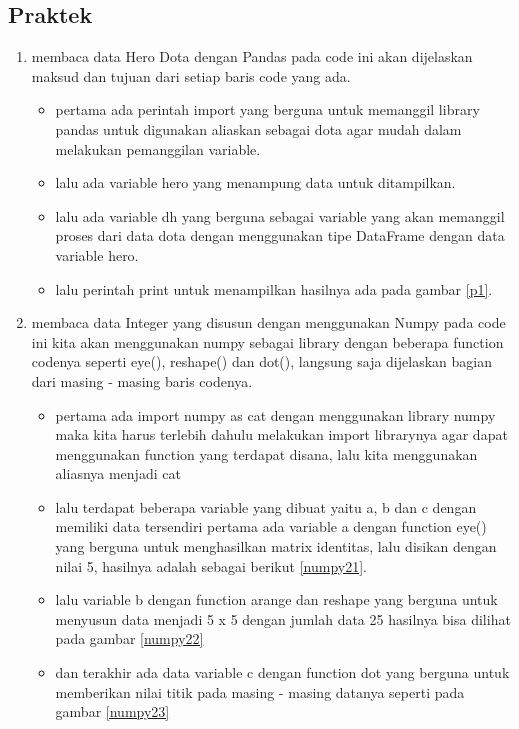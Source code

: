 \subsection{Praktek}
\begin{enumerate}
\item membaca data Hero Dota dengan Pandas
\subitem
pada code ini akan dijelaskan maksud dan tujuan dari setiap baris code yang ada.
\begin{itemize}
\item pertama ada perintah import yang berguna untuk memanggil library pandas untuk digunakan aliaskan sebagai dota agar mudah dalam melakukan pemanggilan variable.
\item lalu ada variable hero yang menampung data untuk ditampilkan.
\item lalu ada variable dh yang berguna sebagai variable yang akan memanggil proses dari data dota dengan menggunakan tipe DataFrame dengan data variable hero.
\item lalu perintah print untuk menampilkan hasilnya ada pada gambar \ref{p1}.
\end{itemize}

\item membaca data Integer yang disusun dengan menggunakan Numpy
\subitem 
pada code ini kita akan menggunakan numpy sebagai library dengan beberapa function codenya seperti eye(), reshape() dan dot(), langsung saja dijelaskan bagian dari masing - masing baris codenya.
\begin{itemize}
\item pertama ada import numpy as cat dengan menggunakan library numpy maka kita harus terlebih dahulu melakukan import librarynya agar dapat menggunakan function yang terdapat disana, lalu kita menggunakan aliasnya menjadi cat
\item lalu terdapat beberapa variable yang dibuat yaitu a, b dan c dengan memiliki data tersendiri pertama ada variable a dengan function eye() yang berguna untuk menghasilkan matrix identitas, lalu disikan dengan nilai 5, hasilnya adalah sebagai berikut \ref{numpy21}.
\item lalu variable b dengan function arange dan reshape yang berguna untuk menyusun data menjadi 5 x 5 dengan jumlah data 25 hasilnya bisa dilihat pada gambar \ref{numpy22}
\item dan terakhir ada data variable c dengan function dot yang berguna untuk memberikan nilai titik pada masing - masing datanya seperti pada gambar \ref{numpy23}
\end{itemize}


\end{enumerate}
